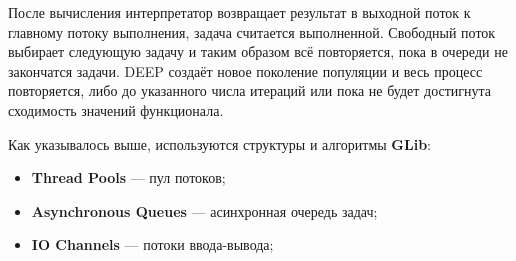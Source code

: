 После вычисления интерпретатор
возвращает результат в
выходной поток к главному потоку выполнения,
задача считается выполненной.
Свободный поток выбирает следующую задачу
и таким образом всё повторяется,
пока в очереди не закончатся задачи.
DEEP создаёт новое поколение популяции
и весь процесс повторяется,
либо до указанного числа итераций или
пока не будет достигнута сходимость
значений функционала.

Как указывалось выше,
используются структуры и алгоритмы
\textbf{GLib}\cite{GLib}:

\begin{itemize}
    \item \textbf{Thread Pools} --- пул потоков;
    \item \textbf{Asynchronous Queues} --- асинхронная очередь задач;
    \item \textbf{IO Channels} --- потоки ввода-вывода;
\end{itemize}

